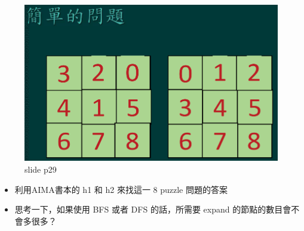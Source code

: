 \documentclass[11pt]{article}
\makeatletter
\providecommand{\tightlist}{%
      \setlength{\itemsep}{0pt}\setlength{\parskip}{0pt}}
\newcommand{\boxspacing}{\kern\kvtcb@left@rule\kern\kvtcb@boxsep}
\newcommand{\prompt}[4]{
        \ttfamily\llap{{\color{#2}[#3]:\hspace{3pt}#4}}\vspace{-\baselineskip}
    }
\makeatother
\begin{document}
\begin{figure}
\centering
\includegraphics{slide-ch3-p29.png}
\caption{slide p29}
\end{figure}

\begin{itemize}
\tightlist
\item
  利用AIMA書本的 h1 和 h2 來找這一 8 puzzle 問題的答案
\item
  思考一下，如果使用 BFS 或者 DFS 的話，所需要 expand
  的節點的數目會不會多很多？
\end{itemize}

    \begin{tcolorbox}[breakable, size=fbox, boxrule=1pt, pad at break*=1mm,colback=cellbackground, colframe=cellborder]
\prompt{In}{incolor}{ }{\boxspacing}
\begin{Verbatim}[commandchars=\\\{\}]

\end{Verbatim}
\end{tcolorbox}


    
    
    
\end{document}
